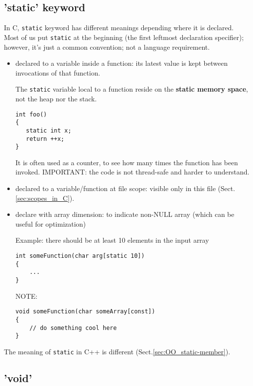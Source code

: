 \subsection{'static' keyword}
\label{sec:static_C}

In C, \verb!static! keyword has different meanings depending where
it is declared. Most of us put \verb!static! at the beginning (the first
leftmost declaration specifier); however, it's just a common convention; not a
language requirement.

\begin{itemize}
  \item declared to a variable inside a function: its latest value is kept
  between invocations of that function. 

The \verb!static! variable local to a function reside on the {\bf static memory
space}, not the heap nor the stack. 
\begin{verbatim}
int foo()
{
   static int x;
   return ++x;
}
\end{verbatim}
It is often used as a counter, to see how many times the
function has been invoked. IMPORTANT: the code is not thread-safe and harder
to understand.
  
  \item declared to a variable/function at file scope: visible only in this
  file (Sect.\ref{sec:scopes_in_C}).

  \item declare with array dimension: to indicate non-NULL array (which can be
  useful for optimization)

Example: there should be at least 10 elements in the input array
\begin{Verbatim}
int someFunction(char arg[static 10])
{
    ...
}
\end{Verbatim}
  
NOTE:
\begin{Verbatim}
void someFunction(char someArray[const])
{
    // do something cool here
}
\end{Verbatim}

  
\end{itemize}

The meaning of \verb!static! in C++ is different 
(Sect.\ref{sec:OO_static-member}).


\subsection{'void'}

